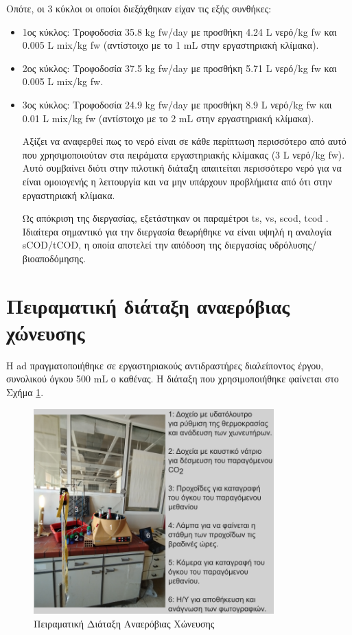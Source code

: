 \documentclass[11pt]{report}
\begin{document}
Οπότε, οι 3 κύκλοι οι οποίοι διεξάχθηκαν είχαν τις εξής συνθήκες:
\begin{itemize}
\item 1ος κύκλος: Τροφοδοσία 35.8 kg \acrshort{fw}/day με προσθήκη 4.24 L νερό/kg \acrshort{fw} και 0.005 L \acrshort{mix}/kg \acrshort{fw} (αντίστοιχο με το 1 mL στην εργαστηριακή κλίμακα).
\item 2ος κύκλος: Τροφοδοσία 37.5 kg \acrshort{fw}/day με προσθήκη 5.71 L νερό/kg \acrshort{fw} και 0.005 L \acrshort{mix}/kg \acrshort{fw}.
\item 3ος κύκλος: Τροφοδοσία 24.9 kg \acrshort{fw}/day με προσθήκη 8.9 L νερό/kg \acrshort{fw} και 0.01 L \acrshort{mix}/kg \acrshort{fw} (αντίστοιχο με το 2 mL στην εργαστηριακή κλίμακα).

Αξίζει να αναφερθεί πως το νερό είναι σε κάθε περίπτωση περισσότερο από αυτό που χρησιμοποιούταν στα πειράματα εργαστηριακής κλίμακας (3 L νερό/kg \acrshort{fw}). Αυτό συμβαίνει διότι στην πιλοτική διάταξη απαιτείται περισσότερο νερό για να είναι ομοιογενής η λειτουργία και να μην υπάρχουν προβλήματα από ότι στην εργαστηριακή κλίμακα.

Ως απόκριση της διεργασίας, εξετάστηκαν οι παραμέτροι \acrshort{ts}, \acrshort{vs}, \acrshort{scod}, \acrshort{tcod} . Ιδιαίτερα σημαντικό για την διεργασία θεωρήθηκε να είναι υψηλή η αναλογία sCOD/tCOD, η οποία αποτελεί την απόδοση της διεργασίας υδρόλυσης/βιοαποδόμησης.
\end{itemize}

\section{Πειραματική διάταξη αναερόβιας χώνευσης}
\label{sec:org47f7863}
Η \acrshort{ad} πραγματοποιήθηκε σε εργαστηριακούς αντιδραστήρες διαλείποντος έργου, συνολικού όγκου 500 mL ο καθένας. Η διάταξη που χρησιμοποιήθηκε φαίνεται στο Σχήμα \ref{fig:org376d55f}.

\begin{figure}[htbp]
\centering
\includegraphics[width=350px]{./anaerobic_digestion_captioned.png}
\caption{\label{fig:org376d55f}Πειραματική Διάταξη Αναερόβιας Χώνευσης}
\end{figure}
\end{document}
